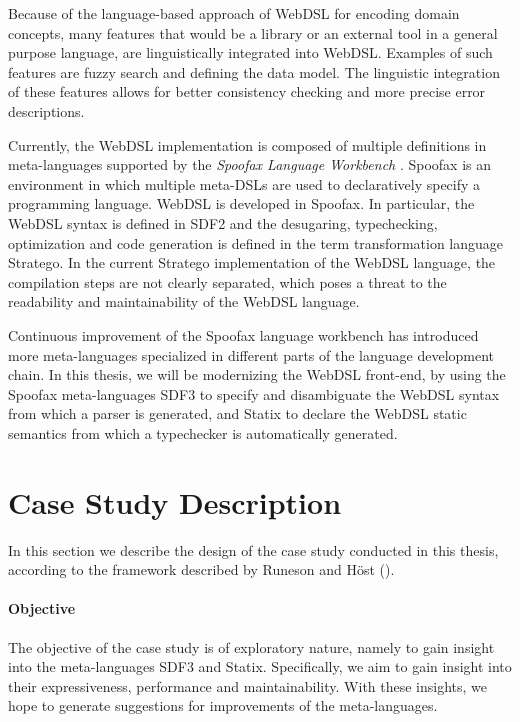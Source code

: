   Because of the language-based approach of WebDSL for encoding domain concepts, many features that would be a library or an external tool in a general purpose language, are linguistically integrated into WebDSL. Examples of such features are fuzzy search and defining the data model. The linguistic integration of these features allows for better consistency checking and more precise error descriptions.
  
  Currently, the WebDSL implementation is composed of multiple definitions in meta-languages supported by the \textit{Spoofax Language Workbench} \autocite{KatsV10}. Spoofax is an environment in which multiple meta-DSLs are used to declaratively specify a programming language. WebDSL is developed in Spoofax. In particular, the WebDSL syntax is defined in SDF2 and the desugaring, typechecking, optimization and code generation is defined in the term transformation language Stratego. In the current Stratego implementation of the WebDSL language, the compilation steps are not clearly separated, which poses a threat to the readability and maintainability of the WebDSL language.

  Continuous improvement of the Spoofax language workbench has introduced more meta-languages specialized in different parts of the language development chain. In this thesis, we will be modernizing the WebDSL front-end, by using the Spoofax meta-languages SDF3 to specify and disambiguate the WebDSL syntax from which a parser is generated, and Statix to declare the WebDSL static semantics from which a typechecker is automatically generated.

  \section{\label{sec:methodology}Case Study Description}

    In this section we describe the design of the case study conducted in this thesis, according to the framework described by Runeson and H\"{o}st (\citeyear{RunesonH09}).

    \paragraph{Objective} The objective of the case study is of exploratory nature, namely to gain insight into the meta-languages SDF3 and Statix. Specifically, we aim to gain insight into their expressiveness, performance and maintainability. With these insights, we hope to generate suggestions for improvements of the meta-languages.

